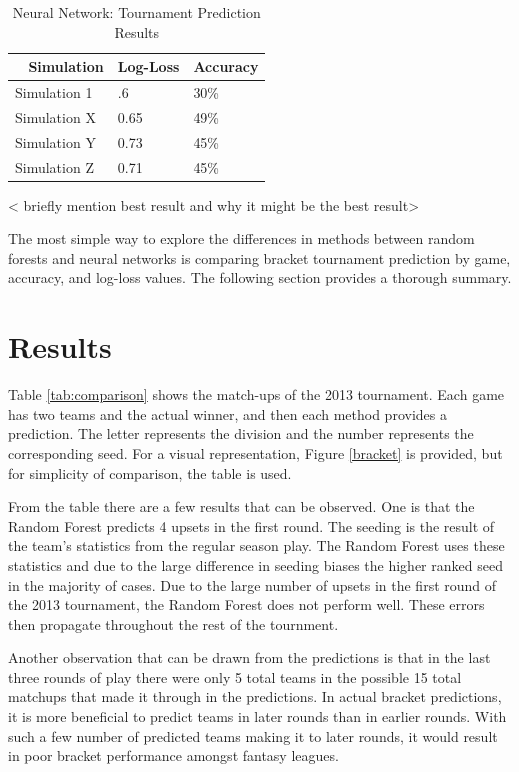 \documentclass[conference]{IEEEtran}
\begin{document}
{\begin{table}[H]
	\centering
    \begin{tabular}{|l|l|l|}
    \hline
    ~   \textbf{Simulation} & \textbf{Log-Loss} & \textbf{Accuracy}\\ \hline
    Simulation 1 & .6 & 30\%\\ \hline
    Simulation X & 0.65 & 49\% \\ \hline
    Simulation Y & 0.73 & 45\% \\ \hline
    Simulation Z & 0.71 & 45\% \\ \hline
    \end{tabular}
    \caption {Neural Network: Tournament Prediction Results}
    \label{tab:nn-pred}
\end{table}
< briefly mention best result and why it might be the best result>

The most simple way to explore the differences in methods between random forests and neural networks is comparing bracket tournament prediction by game, accuracy, and log-loss values.
The following section provides a thorough summary. 

\section{Results}
Table \ref{tab:comparison} shows the match-ups of the 2013 tournament. 
Each game has two teams and the actual winner, and then each method provides a prediction. 
The letter represents the division and the number represents the corresponding seed.
For a visual representation, Figure \ref{bracket} is provided, but for simplicity of comparison, the table is used.

From the table there are a few results that can be observed. 
One is that the Random Forest predicts 4 upsets in the first round. 
The seeding is the result of the team's statistics from the regular season play. 
The Random Forest uses these statistics and due to the large difference in seeding biases the higher ranked seed in the majority of cases. 
Due to the large number of upsets in the first round of the 2013 tournament, the Random Forest does not perform well. 
These errors then propagate throughout the rest of the tournment. 

Another observation that can be drawn from the predictions is that in the last three rounds of play there were only 5 total teams in the possible 15 total matchups that made it through in the predictions. 
In actual bracket predictions, it is more beneficial to predict teams in later rounds than in earlier rounds. 
With such a few number of predicted teams making it to later rounds, it would result in poor bracket performance amongst fantasy leagues.

}
\end{document}
